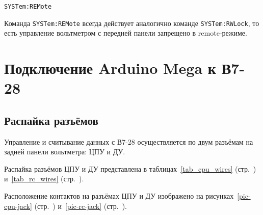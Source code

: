 \documentclass[12pt, a4paper]{article}
\newcommand{\V}{\mbox{В7-28}}
\newcommand{\Arduino}{Arduino Mega}
\newcommand{\CMD}[1]{{\tt #1}}
\newcommand{\CMDSECTION}[1]{\CMD{#1}  }
\begin{document}
\CMDSECTION{SYSTem:REMote}

Команда \CMD{SYSTem:REMote} всегда действует аналогично команде \CMD{SYSTem:RWLock}, то есть управление вольтметром с передней панели запрещено в remote-режиме.



\section{Подключение {\Arduino} к \V}

\subsection{Распайка разъёмов}

Управление и считывание данных с {\V} осуществляется по двум разъёмам на задней панели вольтметра: ЦПУ и ДУ.

Распайка разъёмов ЦПУ и ДУ представлена в таблицах~\ref{tab_cpu_wires} (стр.~\pageref{tab_cpu_wires}) и~\ref{tab_rc_wires} (стр.~\pageref{tab_rc_wires}).

Расположение контактов на разъёмах ЦПУ и ДУ изображено на рисунках~\ref{pic-cpu-jack} (стр.~\pageref{pic-cpu-jack}) и~\ref{pic-rc-jack} (стр.~\pageref{pic-rc-jack}).
\end{document}
